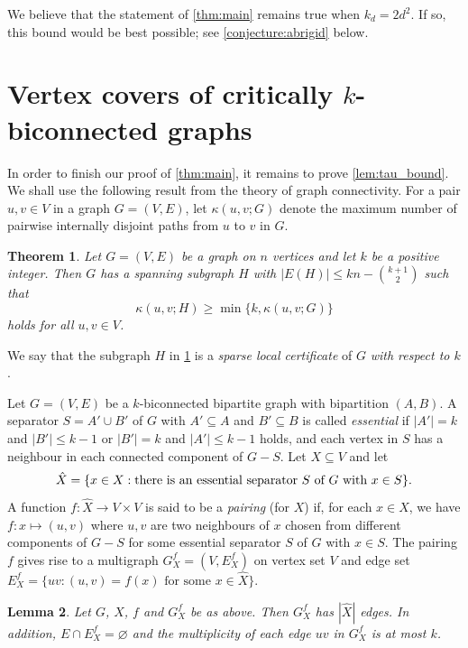 \documentclass[11pt,a4paper,dvipsnames]{scrartcl}
\newtheorem{theorem}{Theorem}[section]
\newtheorem{lemma}[theorem]{Lemma}
\begin{document}
We believe that the statement of \cref{thm:main} remains true when $k_d = 2d^2$. If so, this bound would be best possible; see \cref{conjecture:abrigid} below.

\section{Vertex covers of critically \texorpdfstring{\boldmath $k$}{k}-biconnected graphs}

In order to finish our proof of \cref{thm:main}, it remains to prove \cref{lem:tau_bound}. We shall use the following result from the theory of graph connectivity. For a pair $u,v\in V$ in a graph $G=(V,E)$, let $\kappa(u,v;G)$ denote the maximum number of pairwise internally disjoint paths from $u$ to $v$ in $G$.

\begin{theorem}\cite[Theorem 2.16]{CT}\label{sparse}
    Let $G=(V,E)$ be a graph on $n$ vertices and let $k$ be a positive integer. Then $G$ has a spanning subgraph $H$ with $|E(H)|\leq kn - \binom{k+1}{2}$ such that \[\kappa(u,v;H)\geq \min \{k, \kappa(u,v;G) \}\] holds for all $u,v\in V$.
\end{theorem}

We say that the subgraph $H$ in \cref{sparse} is
a {\em sparse local certificate} of $G$ {\em with respect to $k$}.

Let $G=(V,E)$ be a $k$-biconnected bipartite graph with bipartition $(A,B)$. A separator $S=A'\cup B'$ of $G$ with $A'\subseteq A$ and $B'\subseteq B$ is called {\em essential} if $|A'|=k$ and $|B'|\leq k-1$ or $|B'|=k$ and $|A'|\leq k-1$ holds, and each vertex in $S$ has a neighbour in each connected component of $G-S$. Let $X\subseteq V$ and let \[\hat X=\{ x\in X : \hbox{there is an essential separator $S$ of $G$ with $x\in S$}\}.\] A function $f:\hat X\to V\times V$ is said to be a \emph{pairing} (for $X$) if, for each $x \in \hat X$, we have $f:x\mapsto (u,v)$ where $u,v$ are two neighbours of $x$ chosen from different components of $G-S$ for some essential separator $S$ of $G$ with $x\in S$. The pairing $f$ gives rise to a multigraph $G^f_X=(V,E^f_X)$ on vertex set $V$ and edge set $E^f_X=\{uv:(u,v)=f(x) \mbox{ for some } x\in \hat X\}$.

\begin{lemma}\label{cl}
    Let $G$, $\hat X$, $f$ and $G^f_X$ be as above. Then $G^f_X$ has $|\hat X|$ edges. In addition,
$E\cap E^f_X=\varnothing$
    and
    the multiplicity of each edge
$uv$ in $G^f_X$ is at most $k$.
\end{lemma}
\end{document}

